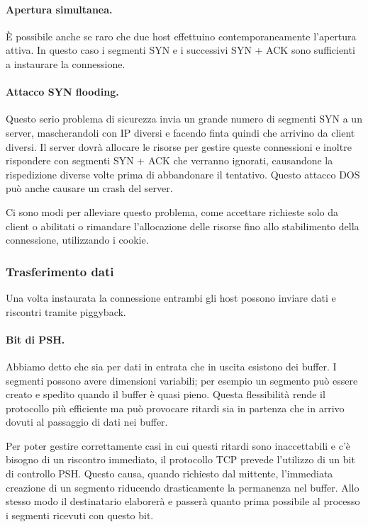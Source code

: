             \paragraph{Apertura simultanea.} È possibile anche se raro che due host effettuino contemporaneamente l'apertura attiva. In questo caso i segmenti SYN e i successivi SYN + ACK sono sufficienti a instaurare la connessione.
            
            \paragraph{Attacco SYN flooding.} Questo serio problema di sicurezza invia un grande numero di segmenti SYN a un server, mascherandoli con IP diversi e facendo finta quindi che arrivino da client diversi. Il server dovrà allocare le risorse per gestire queste connessioni e inoltre rispondere con segmenti SYN + ACK che verranno ignorati, causandone la rispedizione diverse volte prima di abbandonare il tentativo. Questo attacco DOS può anche causare un crash del server.
            
            Ci sono modi per alleviare questo problema, come accettare richieste solo da client o abilitati o rimandare l'allocazione delle risorse fino allo stabilimento della connessione, utilizzando i cookie.
            
        \subsubsection{Trasferimento dati}
            Una volta instaurata la connessione entrambi gli host possono inviare dati e riscontri tramite piggyback.
            
            \paragraph{Bit di PSH.} Abbiamo detto che sia per dati in entrata che in uscita esistono dei buffer. I segmenti possono avere dimensioni variabili; per esempio un segmento può essere creato e spedito quando il buffer è quasi pieno. Questa flessibilità rende il protocollo più efficiente ma può provocare ritardi sia in partenza che in arrivo dovuti al passaggio di dati nei buffer.
            
            Per poter gestire correttamente casi in cui questi ritardi sono inaccettabili e c'è bisogno di un riscontro immediato, il protocollo TCP prevede l'utilizzo di un bit di controllo PSH. Questo causa, quando richiesto dal mittente, l'immediata creazione di un segmento riducendo drasticamente la permanenza nel buffer. Allo stesso modo il destinatario elaborerà e passerà quanto prima possibile al processo i segmenti ricevuti con questo bit.
            
